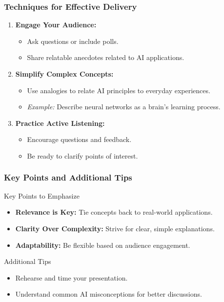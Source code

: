 \documentclass[aspectratio=169]{beamer}
\begin{document}
\begin{frame}[fragile]
    \frametitle{Techniques for Effective Delivery}
    \begin{enumerate}
        \item \textbf{Engage Your Audience:}
        \begin{itemize}
            \item Ask questions or include polls.
            \item Share relatable anecdotes related to AI applications.
        \end{itemize}

        \item \textbf{Simplify Complex Concepts:}
        \begin{itemize}
            \item Use analogies to relate AI principles to everyday experiences.
            \item \textit{Example:} Describe neural networks as a brain's learning process.
        \end{itemize}

        \item \textbf{Practice Active Listening:}
        \begin{itemize}
            \item Encourage questions and feedback.
            \item Be ready to clarify points of interest.
        \end{itemize}
    \end{enumerate}
\end{frame}

\begin{frame}[fragile]
    \frametitle{Key Points and Additional Tips}
    \begin{block}{Key Points to Emphasize}
        \begin{itemize}
            \item \textbf{Relevance is Key:} Tie concepts back to real-world applications.
            \item \textbf{Clarity Over Complexity:} Strive for clear, simple explanations.
            \item \textbf{Adaptability:} Be flexible based on audience engagement.
        \end{itemize}
    \end{block}

    \begin{block}{Additional Tips}
        \begin{itemize}
            \item Rehearse and time your presentation.
            \item Understand common AI misconceptions for better discussions.
        \end{itemize}
    \end{block}
\end{frame}
\end{document}
